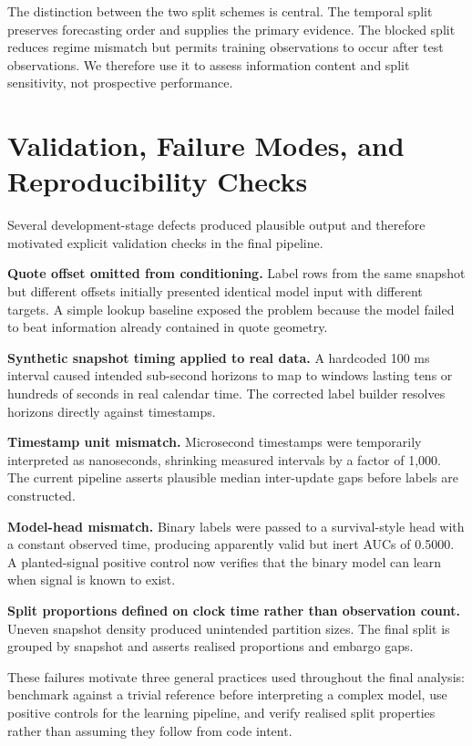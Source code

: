 \documentclass[11pt]{article}
\begin{document}
The distinction between the two split schemes is central. The temporal split preserves forecasting order and supplies the primary evidence. The blocked split reduces regime mismatch but permits training observations to occur after test observations. We therefore use it to assess information content and split sensitivity, not prospective performance.

\section{Validation, Failure Modes, and Reproducibility Checks}
Several development-stage defects produced plausible output and therefore motivated explicit validation checks in the final pipeline.

\textbf{Quote offset omitted from conditioning.} Label rows from the same snapshot but different offsets initially presented identical model input with different targets. A simple lookup baseline exposed the problem because the model failed to beat information already contained in quote geometry.

\textbf{Synthetic snapshot timing applied to real data.} A hardcoded 100 ms interval caused intended sub-second horizons to map to windows lasting tens or hundreds of seconds in real calendar time. The corrected label builder resolves horizons directly against timestamps.

\textbf{Timestamp unit mismatch.} Microsecond timestamps were temporarily interpreted as nanoseconds, shrinking measured intervals by a factor of 1,000. The current pipeline asserts plausible median inter-update gaps before labels are constructed.

\textbf{Model-head mismatch.} Binary labels were passed to a survival-style head with a constant observed time, producing apparently valid but inert AUCs of 0.5000. A planted-signal positive control now verifies that the binary model can learn when signal is known to exist.

\textbf{Split proportions defined on clock time rather than observation count.} Uneven snapshot density produced unintended partition sizes. The final split is grouped by snapshot and asserts realised proportions and embargo gaps.

These failures motivate three general practices used throughout the final analysis: benchmark against a trivial reference before interpreting a complex model, use positive controls for the learning pipeline, and verify realised split properties rather than assuming they follow from code intent.
\end{document}
